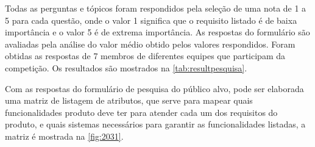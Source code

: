Todas as perguntas e tópicos foram respondidos pela seleção de uma nota de 1 a 5 para cada questão, onde o valor 1 significa que o requisito listado é de baixa importância e
o valor 5 é de extrema importância. As respostas do formulário são avaliadas pela análise do valor médio obtido pelos valores respondidos. Foram obtidas as respostas de 7
membros de diferentes equipes que participam da competição. Os resultados são mostrados na \autoref{tab:resultpesquisa}.

\begin{table}[!ht]
    \caption{Resultado pesquisa de mercado}
    \label{tab:resultpesquisa}
    \centering
\end{table}

Com as respostas do formulário de pesquisa do público alvo, pode ser elaborada uma matriz de listagem de atributos, que serve para mapear quais funcionalidades produto deve ter para atender cada um dos requisitos
do produto, e quais sistemas necessários para garantir as funcionalidades listadas, a matriz é mostrada na \autoref{fig:2031}.

